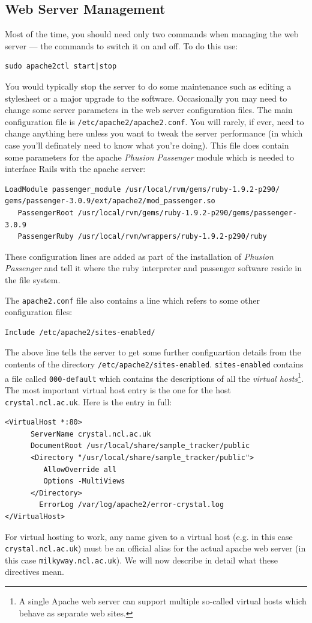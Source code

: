 \documentclass[12pt,twoside]{article}
\begin{document}
\subsection{Web Server Management}
Most of the time, you should need only
two commands when managing the web server --- the commands to switch it on
and off. To do this use:
\begin{verbatim}
sudo apache2ctl start|stop
\end{verbatim}
You would typically stop the server to do some maintenance such as editing
a stylesheet or a major upgrade to the software.
Occasionally you may need to change some server parameters in the
web server configuration files. The main configuration file is
\verb=/etc/apache2/apache2.conf=. You will rarely, if ever, need to
change anything here unless you want to tweak the server performance (in
which case you'll definately need to know what you're doing). This file
does contain some parameters for the apache \emph{Phusion Passenger} 
module which is needed to interface Rails with the apache server:
\begin{verbatim}
LoadModule passenger_module /usr/local/rvm/gems/ruby-1.9.2-p290/
gems/passenger-3.0.9/ext/apache2/mod_passenger.so
   PassengerRoot /usr/local/rvm/gems/ruby-1.9.2-p290/gems/passenger-3.0.9
   PassengerRuby /usr/local/rvm/wrappers/ruby-1.9.2-p290/ruby
\end{verbatim}
These configuration lines are added as part of the installation of
\emph{Phusion Passenger} and tell it where the ruby interpreter and
passenger software reside in the file system.

The \verb=apache2.conf= file also contains a line which refers to some other
configuration files:
\begin{verbatim}
Include /etc/apache2/sites-enabled/
\end{verbatim}
The above line tells the server to get some further configuartion
details from the contents of the directory
\verb=/etc/apache2/sites-enabled=.
\verb=sites-enabled= contains a file called \verb=000-default= which contains
the descriptions of all the \emph{virtual hosts}\footnote{A single Apache
web server can support multiple so-called virtual hosts which behave as
separate web sites.}. The most important virtual host entry is the one
for the host \verb=crystal.ncl.ac.uk=. Here is the entry in full:
\begin{verbatim}
<VirtualHost *:80>
      ServerName crystal.ncl.ac.uk
      DocumentRoot /usr/local/share/sample_tracker/public
      <Directory "/usr/local/share/sample_tracker/public">
         AllowOverride all
         Options -MultiViews
      </Directory>
        ErrorLog /var/log/apache2/error-crystal.log
</VirtualHost>
\end{verbatim}
For virtual hosting to work, any name given to a virtual host
(e.g. in this case \verb=crystal.ncl.ac.uk=) must be an official alias
for the actual apache web server (in this case \verb=milkyway.ncl.ac.uk=).
We will now describe in detail what these directives mean.
\end{document}
